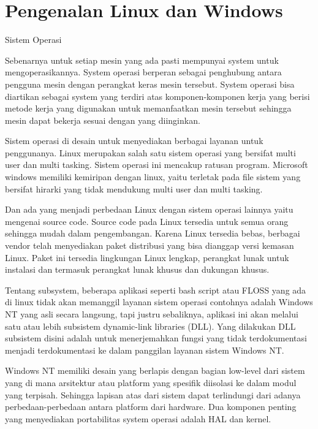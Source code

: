 
\section{Pengenalan Linux dan Windows}
Sistem Operasi

Sebenarnya untuk setiap mesin yang ada pasti mempunyai system untuk mengoperasikannya. System operasi berperan sebagai penghubung antara pengguna mesin dengan perangkat keras mesin tersebut. System operasi bisa diartikan sebagai system yang terdiri atas komponen-komponen kerja yang berisi metode kerja yang digunakan untuk memanfaatkan mesin tersebut sehingga mesin dapat bekerja sesuai dengan yang diinginkan.

Sistem operasi di desain untuk menyediakan berbagai layanan untuk penggunanya. Linux merupakan salah satu sistem operasi yang bersifat multi user dan multi tasking. Sistem operasi ini mencakup ratusan program. Microsoft windows memiliki kemiripan dengan linux, yaitu terletak pada file sistem yang bersifat hirarki yang tidak mendukung multi user dan multi tasking.

Dan ada yang menjadi perbedaan Linux dengan sistem operasi lainnya yaitu mengenai source code. Source code pada Linux tersedia untuk semua orang sehingga mudah dalam pengembangan. Karena Linux tersedia bebas, berbagai vendor telah menyediakan paket distribusi yang bisa dianggap versi kemasan Linux. Paket ini tersedia lingkungan Linux lengkap, perangkat lunak untuk instalasi dan termasuk perangkat lunak khusus dan dukungan khusus.

Tentang subsystem, beberapa aplikasi  seperti bash script atau FLOSS yang ada di linux tidak akan memanggil layanan sistem operasi contohnya adalah Windows NT yang asli secara langsung, tapi justru sebaliknya, aplikasi ini akan melalui satu atau lebih subsistem dynamic-link libraries (DLL). Yang dilakukan DLL subsistem disini adalah untuk menerjemahkan fungsi yang tidak terdokumentasi menjadi terdokumentasi ke dalam panggilan layanan sistem Windows NT.

Windows NT memiliki desain yang berlapis dengan bagian low-level dari sistem yang di mana arsitektur atau platform yang spesifik diisolasi ke dalam modul yang terpisah. Sehingga lapisan atas dari sistem dapat terlindungi dari adanya perbedaan-perbedaan antara platform dari hardware. Dua komponen penting yang menyediakan portabilitas system operasi adalah HAL dan kernel.

